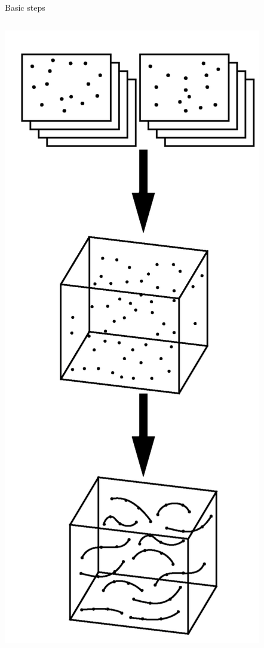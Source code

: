\documentclass[aspectratio=43]{beamer}
\begin{document}
\begin{frame}{Basic steps}
\begin{columns}[t]
\begin{column}{0.3\textwidth}
		\includegraphics[height=.8\textheight]{ptv_steps}
	\end{column}
\end{columns}
\end{frame}
\end{document}
